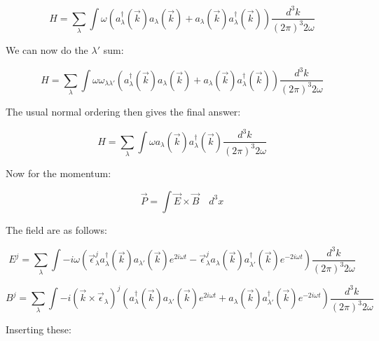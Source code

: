 \documentclass[a4]{article}
\begin{document}
        \begin{equation}
            H = \sum_{\lambda} \int \omega (a_{\lambda}^{\dagger} (\vec{k}) a_{\lambda} (\vec{k}) + a_{\lambda} (\vec{k}) a_{\lambda}^{\dagger} (\vec{k})) \frac{d^{3} k}{(2 \pi)^{3} 2 \omega}
        \end{equation}

    We can now do the $\lambda'$ sum:

        \begin{equation}
            H = \sum_{\lambda} \int \omega \omega_{\lambda \lambda'} (a_{\lambda}^{\dagger} (\vec{k}) a_{\lambda} (\vec{k}) + a_{\lambda} (\vec{k}) a_{\lambda}^{\dagger} (\vec{k})) \frac{d^{3} k}{(2 \pi)^{3} 2 \omega}
        \end{equation}

    The usual normal ordering then gives the final answer:

    \begin{framed}
        \begin{equation}
            H = \sum_{\lambda} \int \omega a_{\lambda} (\vec{k})a_{\lambda}^{\dagger} (\vec{k}) \frac{d^{3} k}{(2 \pi)^{3} 2 \omega}
        \end{equation}
    \end{framed}

    Now for the momentum:

    \begin{equation}
        \vec{P} = \int \vec{E} \times \vec{B} \quad d^{3} x
    \end{equation}

    The field are as follows:

    \begin{equation}
        E^{j} = \sum_{\lambda} \int - i \omega (\vec{\epsilon}_{\lambda}^{j} a^{\dagger}_{\lambda} (\vec{k}) a_{\lambda'} (\vec{k}) e^{2 i \omega t} - \vec{\epsilon}_{\lambda}^{j} a_{\lambda} (\vec{k}) a^{\dagger}_{\lambda'} (\vec{k}) e^{- 2 i \omega t}) \frac{d^{3} k}{(2 \pi)^{3} 2 \omega}
    \end{equation}

    \begin{equation}
        B^{j} = \sum_{\lambda} \int - i (\vec{k} \times \vec{\epsilon}_{\lambda})^{j} (a^{\dagger}_{\lambda} (\vec{k}) a_{\lambda'} (\vec{k}) e^{2 i \omega t} + a_{\lambda} (\vec{k}) a^{\dagger}_{\lambda'} (\vec{k}) e^{- 2 i \omega t}) \frac{d^{3} k}{(2 \pi)^{3} 2 \omega}
    \end{equation}

    Inserting these:
\end{document}
